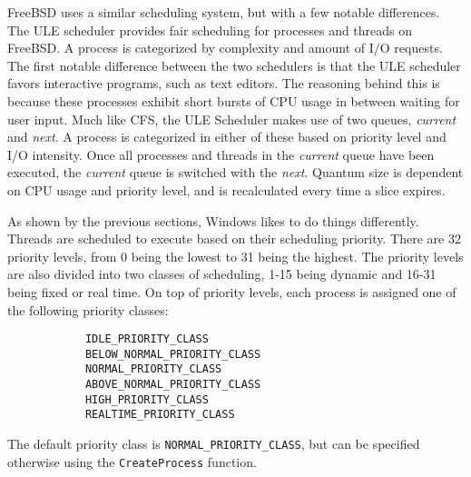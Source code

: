 \documentclass[10pt, onecolumn]{IEEEtran}
\begin{document}
        \vspace{3mm}
        
        FreeBSD uses a similar scheduling system, but with a few notable differences. The ULE scheduler provides fair scheduling for processes and threads on FreeBSD. A process is categorized by complexity and amount of I/O requests. The first notable difference between the two schedulers is that the ULE scheduler favors interactive programs, such as text editors. The reasoning behind this is because these processes exhibit short bursts of CPU usage in between waiting for user input. Much like CFS, the ULE Scheduler makes use of two queues, \textit{current} and \textit{next}. A process is categorized in either of these based on priority level and I/O intensity. Once all processes and threads in the \textit{current} queue have been executed, the \textit{current} queue is switched with the \textit{next}. Quantum size is dependent on CPU usage and priority level, and is recalculated every time a slice expires. 
        
        \vspace{3mm}
        
        As shown by the previous sections, Windows likes to do things differently. Threads are scheduled to execute based on their scheduling priority. There are 32 priority levels, from 0 being the lowest to 31 being the highest. The priority levels are also divided into two classes of scheduling, 1-15 being dynamic and 16-31 being fixed or real time. On top of priority levels, each process is assigned one of the following priority classes:
        
                    
        \begin{lstlisting}
            IDLE_PRIORITY_CLASS
            BELOW_NORMAL_PRIORITY_CLASS
            NORMAL_PRIORITY_CLASS
            ABOVE_NORMAL_PRIORITY_CLASS
            HIGH_PRIORITY_CLASS
            REALTIME_PRIORITY_CLASS
        \end{lstlisting}
    
        The default priority class is \texttt{NORMAL\_PRIORITY\_CLASS}, but can be specified otherwise using the \texttt{CreateProcess} function.
        
\end{document}

